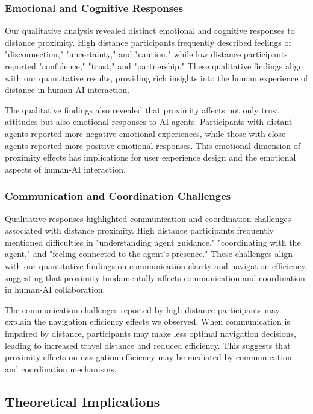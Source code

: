 \documentclass[12pt]{article}
\begin{document}
\subsubsection{Emotional and Cognitive Responses}

Our qualitative analysis revealed distinct emotional and cognitive responses to distance proximity. High distance participants frequently described feelings of "disconnection," "uncertainty," and "caution," while low distance participants reported "confidence," "trust," and "partnership." These qualitative findings align with our quantitative results, providing rich insights into the human experience of distance in human-AI interaction.

The qualitative findings also revealed that proximity affects not only trust attitudes but also emotional responses to AI agents. Participants with distant agents reported more negative emotional experiences, while those with close agents reported more positive emotional responses. This emotional dimension of proximity effects has implications for user experience design and the emotional aspects of human-AI interaction.

\subsubsection{Communication and Coordination Challenges}

Qualitative responses highlighted communication and coordination challenges associated with distance proximity. High distance participants frequently mentioned difficulties in "understanding agent guidance," "coordinating with the agent," and "feeling connected to the agent's presence." These challenges align with our quantitative findings on communication clarity and navigation efficiency, suggesting that proximity fundamentally affects communication and coordination in human-AI collaboration.

The communication challenges reported by high distance participants may explain the navigation efficiency effects we observed. When communication is impaired by distance, participants may make less optimal navigation decisions, leading to increased travel distance and reduced efficiency. This suggests that proximity effects on navigation efficiency may be mediated by communication and coordination mechanisms.

\subsection{Theoretical Implications}
\end{document}
